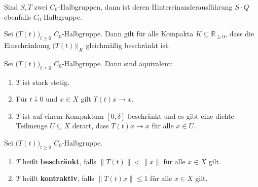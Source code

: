 \begin{prop}\cite{}\label{Hintereinanderausführung von Halbgruppen}
Sind $S, T$ zwei $C_0$-Halbgruppen, dann ist deren Hintereinanderausführung $S\cdot Q$ ebenfalls $C_0$-Halbgruppe.
\end{prop}


\begin{prop}\cite{}\label{Gleichmäßige Stetigkeit von Halbgruppen auf Kompakta}
Sei $\big(T(t)\big)_{t\geq0}$ $C_0$-Halbgruppe. Dann gilt für alle Kompakta $K\subseteq \mathbb R_{\geq0}$, dass die Einschränkung $\big(T(t)\big)|_K$ gleichmäßig beschränkt ist.
\end{prop}


\begin{prop}\cite{}\label{Charakterisierung der starken Stetigkeit}
Sei $\big(T(t)\big)_{t\geq0}$ $C_0$-Halbgruppe. Dann sind äquivalent:
\begin{enumerate}
\item $T$ ist stark stetig.
\item Für $t\downarrow 0$ und $x\in X$ gilt $T(t)x\to x$.
\item $T$ ist auf einem Kompaktum $[0,\delta]$ beschränkt und es gibt eine dichte Teilmenge $U\subseteq X$ derart, dass $T(t)x\to x$ für alle $x\in U$.
\end{enumerate}
\end{prop}

\begin{defi}[Beschränktheit]
Sei $\big(T(t)\big)_{t\geq0}$ $C_0$-Halbgruppe. 
\begin{enumerate}
\item $T$ heißt \textbf{beschränkt}, falls $\|T(t)\|< \|x\|$ für alle $x\in X$ gilt.
\item $T$ heißt \textbf{kontraktiv}, falls $\|T(t)x\|\leq 1$ für alle $x\in X$ gilt.
\end{enumerate}
\end{defi}

